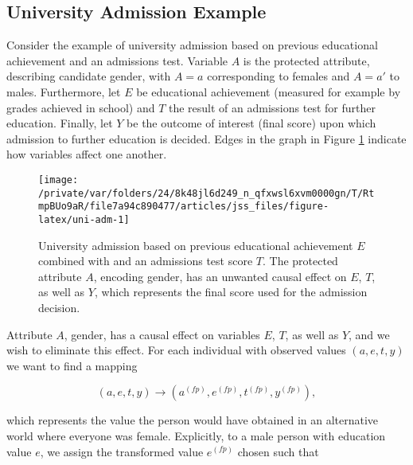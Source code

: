 \documentclass[
  nojss]{jss}
\begin{document}
\hypertarget{university-admission-example}{%
\subsection{University Admission
Example}\label{university-admission-example}}

Consider the example of university admission based on previous
educational achievement and an admissions test. Variable \(A\) is the
protected attribute, describing candidate gender, with \(A = a\)
corresponding to females and \(A = a'\) to males. Furthermore, let \(E\)
be educational achievement (measured for example by grades achieved in
school) and \(T\) the result of an admissions test for further
education. Finally, let \(Y\) be the outcome of interest (final score)
upon which admission to further education is decided. Edges in the graph
in Figure \ref{fig:uni-adm} indicate how variables affect one another.

\begin{CodeChunk}
\begin{figure}

{\centering \texttt{[image: /private/var/folders/24/8k48jl6d249\_n\_qfxwsl6xvm0000gn/T/RtmpBUo9aR/file7a94c890477/articles/jss\_files/figure-latex/uni-adm-1]} 

}

\caption[University admission based on previous educational achievement $E$ combined with and an admissions test score $T$]{University admission based on previous educational achievement $E$ combined with and an admissions test score $T$. The protected attribute $A$, encoding gender, has an unwanted causal effect on  $E$, $T$, as well as $Y$, which represents the final score used for the admission decision.}\label{fig:uni-adm}
\end{figure}
\end{CodeChunk}

Attribute \(A\), gender, has a causal effect on variables \(E\), \(T\),
as well as \(Y\), and we wish to eliminate this effect. For each
individual with observed values \((a, e, t, y)\) we want to find a
mapping

\[(a, e, t, y) \longrightarrow  ( {a}^{(fp)},  {e}^{(fp)},  {t}^{(fp)},  {y}^{(fp)}),\]

which represents the value the person would have obtained in an
alternative world where everyone was female. Explicitly, to a male
person with education value \(e\), we assign the transformed value
\( {e}^{(fp)}\) chosen such that
\end{document}
